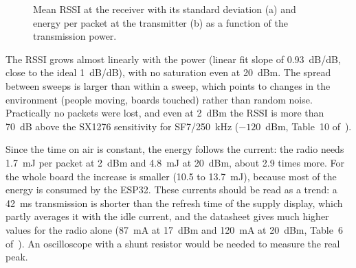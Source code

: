 \documentclass[informe,english]{plantilla}
\begin{document}
\begin{figure}[htbp]
    \centering
{}
\hfill
{}
\caption{Mean RSSI at the receiver with its standard deviation (a) and energy per packet at the transmitter (b) as a function of the transmission power.}
\label{fig:txpower-results}
\end{figure}


The RSSI grows almost linearly with the power (linear fit slope of 0.93~dB/dB, close to the ideal 1~dB/dB), with no saturation even at 20~dBm. The spread between sweeps is larger than within a sweep, which points to changes in the environment (people moving, boards touched) rather than random noise. Practically no packets were lost, and even at 2~dBm the RSSI is more than 70~dB above the SX1276 sensitivity for SF7/250~kHz ($-120$~dBm, Table~10 of~\cite{sx1276}).

Since the time on air is constant, the energy follows the current: the radio needs 1.7~mJ per packet at 2~dBm and 4.8~mJ at 20~dBm, about 2.9 times more. For the whole board the increase is smaller (10.5 to 13.7~mJ), because most of the energy is consumed by the ESP32. These currents should be read as a trend: a 42~ms transmission is shorter than the refresh time of the supply display, which partly averages it with the idle current, and the datasheet gives much higher values for the radio alone (87~mA at 17~dBm and 120~mA at 20~dBm, Table~6 of~\cite{sx1276}). An oscilloscope with a shunt resistor would be needed to measure the real peak.
\end{document}
